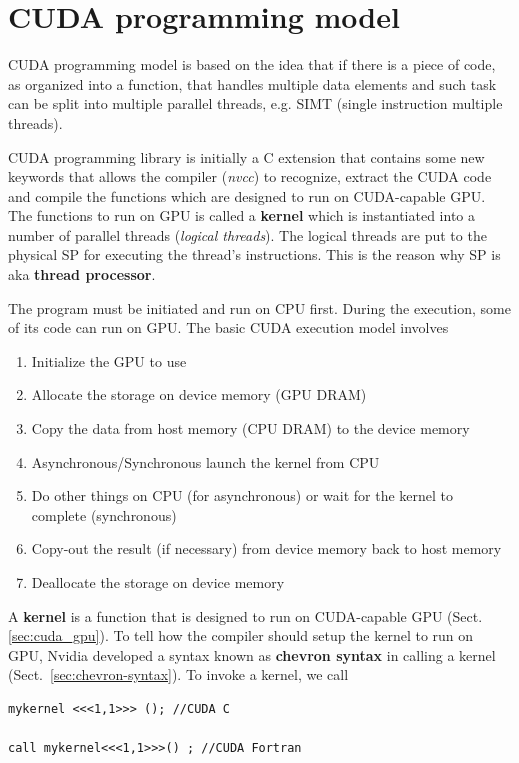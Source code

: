 \section{CUDA programming model}
\label{sec:cuda-progr-model}


CUDA programming model is based on the idea that if there is a piece of code, as
organized into a function, that handles multiple data elements and such task can
be split into multiple parallel threads, e.g. SIMT (single instruction multiple
threads).

CUDA programming library is initially a C extension that contains some new
keywords that allows the compiler ({\it nvcc}) to recognize, extract the CUDA
code and compile the functions which are designed to run on CUDA-capable GPU.
The functions to run on GPU is called a {\bf kernel} which is instantiated into
a number of parallel threads ({\it logical threads}). The logical threads are
put to the physical SP for executing the thread's instructions. This is the
reason why SP is aka {\bf thread processor}.

The program must be initiated and run on CPU first. During the execution,
some of its code can run on GPU. The basic CUDA execution model involves
  \begin{enumerate}
  \item Initialize the GPU to use 
  \item Allocate the storage  on device memory (GPU DRAM)
  \item Copy the data from host memory (CPU DRAM) to the device memory 
  \item Asynchronous/Synchronous launch the kernel from CPU 
  \item Do other things on CPU (for asynchronous) or wait for the kernel to
  complete (synchronous)
  \item Copy-out the result (if necessary) from device memory back to
    host memory 
  \item Deallocate the storage on device memory
  \end{enumerate}


A {\bf kernel} is a function that is designed to run on CUDA-capable GPU
(Sect.\ref{sec:cuda_gpu}). To tell how the compiler should setup the
kernel to run on GPU, Nvidia developed a syntax known as {\bf chevron syntax} in
calling a kernel (Sect.~\ref{sec:chevron-syntax}). To invoke a kernel, we
call
\begin{lstlisting}
mykernel <<<1,1>>> (); //CUDA C

call mykernel<<<1,1>>>() ; //CUDA Fortran
\end{lstlisting}

